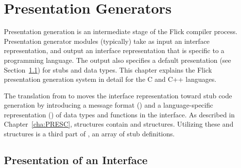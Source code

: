 

\chapter{Presentation Generators}
\label{cha:PG}

Presentation generation is an intermediate stage of the Flick \IDL{} compiler
process.  Presentation generator modules (typically) take as input an \AOI{}
interface representation, and output an interface representation that is
specific to a programming language.  The output also specifies a default
presentation (see Section~\ref{sec:PG:Presentation of an Interface}) for stubs
and data types.  This chapter explains the Flick presentation generation system
in detail for the C and C++ languages.

The translation from \AOI{} to \PRESC{} moves the interface representation
toward stub code generation by introducing a message format (\MINT{}) and a
language-specific representation (\CAST{}) of data types and functions in the
interface.  As described in Chapter~\ref{cha:PRESC}, \PRESC{} structures
contain \MINT{} and \CAST{} structures.  Utilizing these \MINT{} and \CAST{}
structures is a third part of \PRESC{}, an array of stub definitions.



\section{Presentation of an Interface}
\label{sec:PG:Presentation of an Interface}

